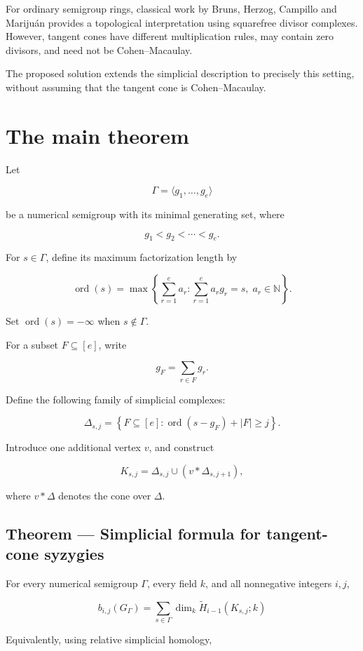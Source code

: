 \documentclass[11pt]{article}
\begin{document}
For ordinary semigroup rings, classical work by Bruns, Herzog, Campillo and Marijuán provides a topological interpretation using squarefree divisor complexes. However, tangent cones have different multiplication rules, may contain zero divisors, and need not be Cohen--Macaulay.

The proposed solution extends the simplicial description to precisely this setting, without assuming that the tangent cone is Cohen--Macaulay.

\section{The main theorem}

Let

\[
\Gamma=\langle g_1,\ldots,g_e\rangle
\]

be a numerical semigroup with its minimal generating set, where

\[
g_1<g_2<\cdots<g_e.
\]

For \(s\in\Gamma\), define its maximum factorization length by

\[
\operatorname{ord}(s)=
\max\left\{
\sum_{r=1}^{e}a_r:
\sum_{r=1}^{e}a_rg_r=s,\;
a_r\in\mathbb N
\right\}.
\]

Set \(\operatorname{ord}(s)=-\infty\) when \(s\notin\Gamma\).

For a subset \(F\subseteq[e]\), write

\[
g_F=\sum_{r\in F}g_r.
\]

Define the following family of simplicial complexes:

\[
\Delta_{s,j}=
\left\{
F\subseteq[e]:
\operatorname{ord}(s-g_F)+|F|\ge j
\right\}.
\]

Introduce one additional vertex \(v\), and construct

\[
K_{s,j}=
\Delta_{s,j}\cup
\left(v*\Delta_{s,j+1}\right),
\]

where \(v*\Delta\) denotes the cone over \(\Delta\).

\subsection{Theorem --- Simplicial formula for tangent-cone syzygies}

For every numerical semigroup \(\Gamma\), every field \(k\), and all nonnegative integers \(i,j\),

\[
\boxed{b_{i,j}(G_\Gamma)=\sum_{s\in\Gamma}\dim_k\widetilde H_{i-1}(K_{s,j};k)}
\]

Equivalently, using relative simplicial homology,
\end{document}
